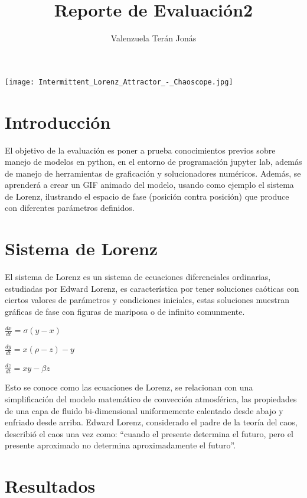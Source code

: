 \documentclass[a4paper]{article}
\title{Reporte de Evaluación2}
\author{Valenzuela Terán Jonás}
\begin{document}
\maketitle

\begin{center}
	\texttt{[image: Intermittent\_Lorenz\_Attractor\_-\_Chaoscope.jpg]}
\end{center}


\section{Introducción}

El objetivo de la evaluación es poner a prueba conocimientos previos sobre manejo de modelos en python, en el entorno de programación jupyter lab, además de manejo de herramientas de graficación y solucionadores numéricos. Además, se aprenderá a crear un GIF animado del modelo, usando como ejemplo el sistema de Lorenz, ilustrando el espacio de fase (posición contra posición) que produce con diferentes parámetros definidos.


\section{Sistema de Lorenz}

El sistema de Lorenz es un sistema de ecuaciones diferenciales ordinarias, estudiadas por Edward Lorenz, es característica por tener soluciones caóticas con ciertos valores de parámetros y condiciones iniciales, estas soluciones muestran gráficas de fase con figuras de mariposa o de infinito comunmente.

\begin{center}
$\frac{dx}{dt} = \sigma (y - x)$

$\frac{dy}{dt} = x(\rho - z) - y$

$\frac{dz}{dt} = xy - \beta z$
\end{center}

Esto se conoce como las ecuaciones de Lorenz, se relacionan con una simplificación del modelo matemático de convección atmosférica, las propiedades de una capa de fluido bi-dimensional uniformemente calentado desde abajo y enfriado desde arriba. Edward Lorenz, considerado el padre de la teoría del caos, describió el caos una vez como: “cuando el presente determina el futuro, pero el presente aproximado no determina aproximadamente el futuro”.

\section{Resultados}
\end{document}
